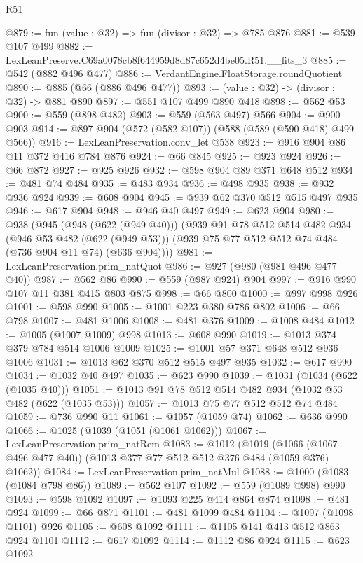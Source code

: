 \begin{lexlean}{R51}
\begin{coremodule}
@879 := fun (value : @32) => fun (divisor : @32) => @785 @876
@881 := @539 @107 @499
@882 := LexLeanPreserve.C69a0078cb8f644959d8d87c652d4be05.R51.__fits_3
@885 := @542 (@882 @496 @477)
@886 := VerdantEngine.FloatStorage.roundQuotient
@890 := @885 (@66 (@886 @496 @477))
@893 := (value : @32) -> (divisor : @32) -> @881 @890
@897 := @551 @107 @499 @890 @418
@898 := @562 @53
@900 := @559 (@898 @482)
@903 := @559 (@563 @497) @566
@904 := @900 @903
@914 := @897 @904 (@572 (@582 @107)) (@588 (@589 (@590 @418) @499 @566))
@916 := LexLeanPreservation.conv_let @538
@923 := @916 @904 @86 @11 @372 @416 @784 @876
@924 := @66 @845
@925 := @923 @924
@926 := @66 @872
@927 := @925 @926
@932 := @598 @904 @89 @371 @648 @512
@934 := @481 @74 @484
@935 := @483 @934
@936 := @498 @935
@938 := @932 @936 @924
@939 := @608 @904
@945 := @939 @62 @370 @512 @515 @497 @935
@946 := @617 @904
@948 := @946 @40 @497
@949 := @623 @904
@980 := @938
    (@945
      (@948 (@622 (@949 @40)))
      (@939
        @91
        @78
        @512
        @514
        @482
        @934
        (@946 @53 @482 (@622 (@949 @53)))
        (@939 @75 @77 @512 @512 @74 @484 (@736 @904 @11 @74) (@636 @904))))
@981 := LexLeanPreservation.prim_natQuot
@986 := @927 (@980 (@981 @496 @477 @40))
@987 := @562 @86
@990 := @559 (@987 @924) @904
@997 := @916 @990 @107 @11 @381 @415 @803 @875
@998 := @66 @800
@1000 := @997 @998 @926
@1001 := @598 @990
@1005 := @1001 @223 @380 @786 @802
@1006 := @66 @798
@1007 := @481 @1006
@1008 := @481 @376
@1009 := @1008 @484
@1012 := @1005 (@1007 @1009) @998
@1013 := @608 @990
@1019 := @1013 @374 @379 @784 @514 @1006 @1009
@1025 := @1001 @57 @371 @648 @512 @936 @1006
@1031 := @1013 @62 @370 @512 @515 @497 @935
@1032 := @617 @990
@1034 := @1032 @40 @497
@1035 := @623 @990
@1039 := @1031 (@1034 (@622 (@1035 @40)))
@1051 := @1013 @91 @78 @512 @514 @482 @934 (@1032 @53 @482 (@622 (@1035 @53)))
@1057 := @1013 @75 @77 @512 @512 @74 @484
@1059 := @736 @990 @11
@1061 := @1057 (@1059 @74)
@1062 := @636 @990
@1066 := @1025 (@1039 (@1051 (@1061 @1062)))
@1067 := LexLeanPreservation.prim_natRem
@1083 := @1012
    (@1019 (@1066 (@1067 @496 @477 @40)) (@1013 @377 @77 @512 @512 @376 @484 (@1059 @376) @1062))
@1084 := LexLeanPreservation.prim_natMul
@1088 := @1000 (@1083 (@1084 @798 @86))
@1089 := @562 @107
@1092 := @559 (@1089 @998) @990
@1093 := @598 @1092
@1097 := @1093 @225 @414 @864 @874
@1098 := @481 @924
@1099 := @66 @871
@1101 := @481 @1099 @484
@1104 := @1097 (@1098 @1101) @926
@1105 := @608 @1092
@1111 := @1105 @141 @413 @512 @863 @924 @1101
@1112 := @617 @1092
@1114 := @1112 @86 @924
@1115 := @623 @1092

\end{coremodule}
\end{lexlean}

